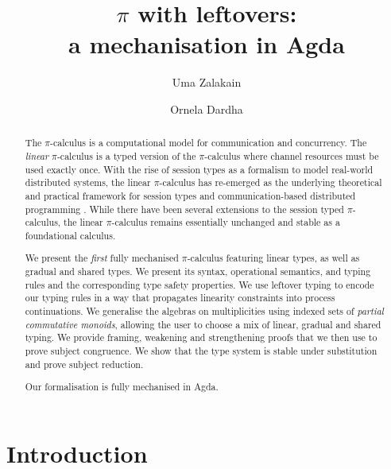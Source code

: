 \documentclass[a4paper,UKenglish,cleveref, autoref, thm-restate,authorcolumns]{lipics-v2019}
\title{$\pi$ with leftovers: \\ a mechanisation in Agda}
\author{Uma Zalakain}{University of Glasgow, Scotland}
       {u.zalakain.1@research.gla.ac.uk}{https://orcid.org/0000-0002-3268-9338}{}
\author{Ornela Dardha}{University of Glasgow, Scotland}
       {ornela.dardha@glasgow.ac.uk}{https://orcid.org/0000-0001-9927-7875}{}
\theoremstyle{definition}
\newcommand{\picalc}{$\pi$-calculus}
\begin{document}
\maketitle

\begin{abstract}
  The \picalc{} is a computational model for communication and concurrency.
  The \emph{linear} \picalc{} is a typed version of the \picalc{} where channel resources must be used exactly once.
  With the rise of session types as a formalism to model real-world distributed systems, the linear \picalc{} has re-emerged as the underlying theoretical and practical framework for session types and communication-based distributed programming \cite{DardhaGS12,Padovani17,ScalasY16,ScalasDHY17}.
  While there have been several extensions to the session typed \picalc{}, the linear \picalc{} remains essentially unchanged and stable as a foundational calculus.

  We present the \emph{first} fully mechanised \picalc{} featuring linear types, as well as gradual and shared types.
  We present its syntax, operational semantics, and typing rules and the corresponding type safety properties.
  We use leftover typing \cite{Allais2018a} to encode our typing rules in a way that propagates linearity constraints into process continuations.
  We generalise the algebras on multiplicities using indexed sets of \emph{partial commutative monoids}, allowing the user to choose a mix of linear, gradual and shared typing.
  We provide framing, weakening and strengthening proofs that we then use to prove subject congruence.
  We show that the type system is stable under substitution and prove subject reduction.

  Our formalisation is fully mechanised in Agda. \cite{Zalakain2020Agda}
\end{abstract}


\section{Introduction}
\end{document}
